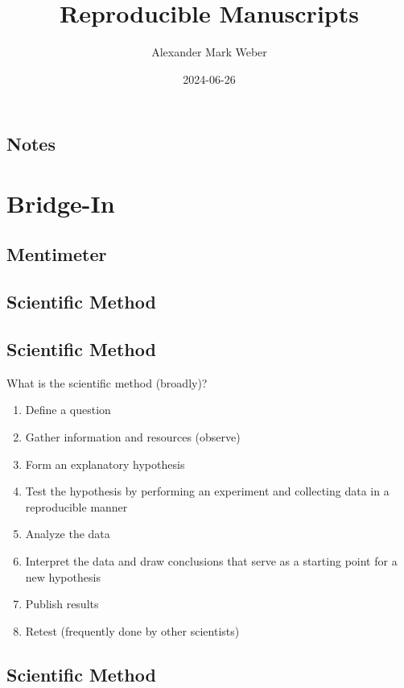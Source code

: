 \documentclass[
  letterpaper,
  DIV=11,
  numbers=noendperiod]{scrartcl}
\title{Reproducible Manuscripts}
\author{Alexander Mark Weber}
\date{2024-06-26}
\begin{document}
\maketitle

\subsection{Notes}\label{notes}

\section{Bridge-In}\label{bridge-in}

\subsection{Mentimeter}\label{mentimeter}

\subsection{Scientific Method}\label{scientific-method}

\subsection{Scientific Method}\label{scientific-method-1}

What is the scientific method (broadly)?

\begin{enumerate}
\def\labelenumi{\arabic{enumi}.}
\item
  Define a question
\item
  Gather information and resources (observe)
\item
  Form an explanatory hypothesis
\item
  Test the hypothesis by performing an experiment and collecting data in
  a reproducible manner
\item
  Analyze the data
\item
  Interpret the data and draw conclusions that serve as a starting point
  for a new hypothesis
\item
  Publish results
\item
  Retest (frequently done by other scientists)
\end{enumerate}

\subsection{Scientific Method}\label{scientific-method-2}
\end{document}
